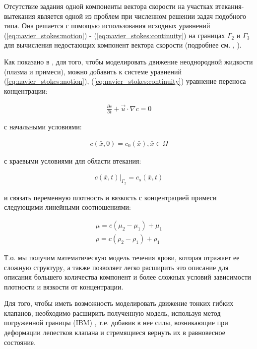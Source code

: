 Отсутствие задания одной компоненты вектора скорости на участках
втекания-вытекания является одной из проблем при численном решении задач
подобного типа. Она решается с помощью использования исходных уравнений
(\ref{eq:navier_stokes:motion}) - (\ref{eq:navier_stokes:continuity}) на
границах \(\Gamma_2\) и \(\Gamma_3\) для вычисления недостающих
компонент вектора скорости (подробнее см. \cite{gummel2013motion}, \cite{geidarov2011solution}).

Как показано в \cite{gummel2013motion}, для того, чтобы моделировать движение
неоднородной жидкости (плазма и примеси), можно добавить к системе
уравнений (\ref{eq:navier_stokes:motion}),
(\ref{eq:navier_stokes:continuity}) уравнение переноса концентрации:

\begin{gather}
    \label{eq:convection}
    \frac{\partial c}{\partial t} + \vec{u} \cdot \nabla c = 0
\end{gather}

с начальными условиями:

\begin{gather}
    \label{eq:convection:conditions}
    c(\bar{x}, 0) = c_0(\bar{x}), \bar{x} \in \Omega
\end{gather}

с краевыми условиями для области втекания:

\begin{gather}
    \label{eq:convection:conditions}
    c(\bar{x}, t)|_{\Gamma_2} = c_s(\bar{x}, t)
\end{gather}

и связать переменную плотность и вязкость с концентрацией примеси
следующими линейными соотношениями:

\begin{gather}
    \label{eq:viscosity}
    \mu = c (\mu_2 - \mu_1) + \mu_1\\
    \label{eq:density}
    \rho = c (\rho_2 - \rho_1) + \rho_1
\end{gather}

Т.о. мы получим математическую модель течения крови, которая отражает ее
сложную структуру, а также позволяет легко расширить это описание для
описания большего количества компонент и более сложных условий
зависимости плотности и вязкости от концентрации.

Для того, чтобы иметь возможность моделировать движение тонких гибких клапанов,
необходимо расширить полученную модель, используя метод погруженной границы
(IBM) \cite{peskin2002immersed}, т.е. добавив в нее силы, возникающие при деформации лепестков клапана и
стремящиеся вернуть их в равновесное состояние.

